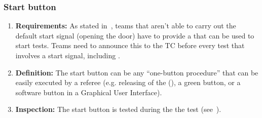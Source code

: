\subsubsection{Start button}
\label{rule:start_button}

\begin{enumerate}
	\item \textbf{Requirements:} As stated in~, teams that aren't able to carry out the default start signal (opening the door) have to provide a  that can be used to start tests.
	Teams need to announce this to the TC before every test that involves a start signal, including .

	\item \textbf{Definition:} The start button can be any \enquote{one-button procedure} that can be easily executed by a referee (e.g. releasing of the  (), a green button, or a software button in a Graphical User Interface).
	\item \textbf{Inspection:} The start button is tested during the the  test (see~).
\end{enumerate}









